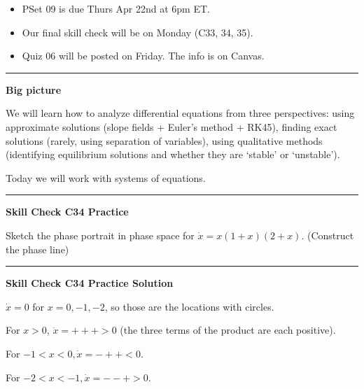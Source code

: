 \documentclass[12pt,letterpaper,noanswers]{exam}
\begin{document}
 \pdfpageheight 11in 
  \pdfpagewidth 8.5in





\begin{itemize}
\itemsep0em
\item PSet 09 is due Thurs Apr 22nd at 6pm ET.
\item Our final skill check will be on Monday (C33, 34, 35).
\item Quiz 06 will be posted on Friday.  The info is on Canvas.
\end{itemize}

\hrule
\vspace{0.2cm}


\noindent\textbf{Big picture}

We will learn how to analyze differential equations from three perspectives: using approximate solutions (slope fields + Euler's method + RK45), finding exact solutions (rarely, using separation of variables), using qualitative methods (identifying equilibrium solutions and whether they are `stable' or `unstable').

Today we will work with systems of equations.

\vspace{0.2cm}
\hrule
\vspace{0.2cm}


\noindent\textbf{Skill Check C34 Practice}

Sketch the phase portrait in phase space for $\dot x = x(1+x)(2+x)$.  (Construct the phase line)


\vspace{0.2cm}
\hrule
\vspace{0.2cm}

\noindent\textbf{Skill Check C34 Practice Solution}

$\dot x = 0$ for $x = 0, -1, -2$, so those are the locations with circles.

For $x > 0$, $\dot x = + + + > 0$ (the three terms of the product are each positive).

For $-1 < x < 0, \dot x = - + + < 0$.

For $-2 < x < -1, \dot x = - - + > 0$.
\end{document}
